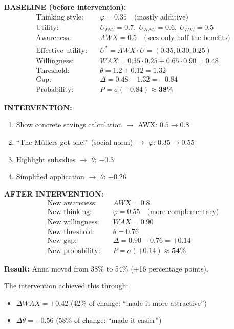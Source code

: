 \begin{example}

\textbf{BASELINE (before intervention):}
\begin{align*}
\text{Thinking style:} \quad & \varphi = 0.35 \quad \text{(mostly additive)}\\
\text{Utility:} \quad & U_{INU} = 0.7, \; U_{KNU} = 0.6, \; U_{IDU} = 0.5\\
\text{Awareness:} \quad & AWX = 0.5 \quad \text{(sees only half the benefits)}\\
\text{Effective utility:} \quad & U^* = AWX \cdot U = (0.35, 0.30, 0.25)\\
\text{Willingness:} \quad & WAX = 0.35 \cdot 0.25 + 0.65 \cdot 0.90 = 0.48\\
\text{Threshold:} \quad & \theta = 1.2 + 0.12 = 1.32\\
\text{Gap:} \quad & \Delta = 0.48 - 1.32 = -0.84\\
\text{Probability:} \quad & P = \sigma(-0.84) \approx \mathbf{38\%}
\end{align*}

\textbf{INTERVENTION:}
\begin{enumerate}
\item Show concrete savings calculation $\rightarrow$ AWX: $0.5 \rightarrow 0.8$
\item ``The Müllers got one!'' (social norm) $\rightarrow$ $\varphi$: $0.35 \rightarrow 0.55$
\item Highlight subsidies $\rightarrow$ $\theta$: $-0.3$
\item Simplified application $\rightarrow$ $\theta$: $-0.26$
\end{enumerate}

\textbf{AFTER INTERVENTION:}
\begin{align*}
\text{New awareness:} \quad & AWX = 0.8\\
\text{New thinking:} \quad & \varphi = 0.55 \quad \text{(more complementary)}\\
\text{New willingness:} \quad & WAX = 0.90\\
\text{New threshold:} \quad & \theta = 0.76\\
\text{New gap:} \quad & \Delta = 0.90 - 0.76 = +0.14\\
\text{New probability:} \quad & P = \sigma(+0.14) \approx \mathbf{54\%}
\end{align*}

\textbf{Result:} Anna moved from 38\% to 54\% (+16 percentage points).

The intervention achieved this through:
\begin{itemize}
\item $\Delta WAX = +0.42$ (42\% of change: ``made it more attractive'')
\item $\Delta \theta = -0.56$ (58\% of change: ``made it easier'')
\end{itemize}
\end{example}

